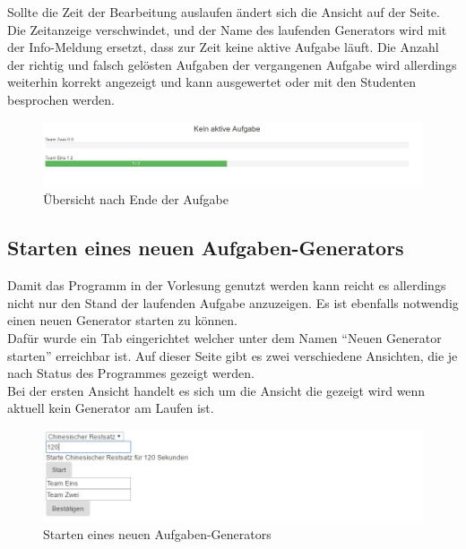 \begin{enumerate}
Sollte die Zeit der Bearbeitung auslaufen ändert sich die Ansicht auf der Seite. Die Zeitanzeige verschwindet, und der Name des laufenden Generators wird mit der Info-Meldung ersetzt, dass zur Zeit keine aktive Aufgabe läuft. Die Anzahl der richtig und falsch gelösten Aufgaben der vergangenen Aufgabe wird allerdings weiterhin korrekt angezeigt und kann ausgewertet oder mit den Studenten besprochen werden.

\begin{figure}[htp]     %
\centering
\includegraphics[width=1\textwidth]{bilder/TaskOver} 
\caption[Übersicht nach Ende der Aufgabe]{Übersicht nach Ende der Aufgabe}
\end{figure} 


\subsection{Starten eines neuen Aufgaben-Generators}

Damit das Programm in der Vorlesung genutzt werden kann reicht es allerdings nicht nur den Stand der laufenden Aufgabe anzuzeigen. Es ist ebenfalls notwendig einen neuen Generator starten zu können. \\
Dafür wurde ein Tab eingerichtet welcher unter dem Namen ``Neuen Generator starten'' erreichbar ist.
Auf dieser Seite gibt es zwei verschiedene Ansichten, die je nach Status des Programmes gezeigt werden. \\
Bei der ersten Ansicht handelt es sich um die Ansicht die gezeigt wird wenn aktuell kein Generator am Laufen ist. \\

\begin{figure}[htp]     %
\centering
\includegraphics[width=1\textwidth]{bilder/StartNew} 
\caption[Starten eines neuen Aufgaben-Generators]{Starten eines neuen Aufgaben-Generators}
\end{figure} 


\end{enumerate}

